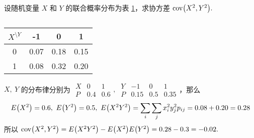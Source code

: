 \begin{example}[2002 数三]
    设随机变量 $X$ 和 $Y$ 的联合概率分布为表 \ref{-101007018015}，求协方差 $\mathrm{cov}\qty(X^2,Y^2).$
\end{example}
\begin{solution}
    \begin{minipage}{0.3\linewidth}
        \begin{table}[H]
            \centering
            \caption{}
            \label{-101007018015}
            \begin{tabular}{c | c c c}
                $X^{\displaystyle\setminus Y}$ & -1   & 0    & 1    \\
                \midrule
                0                              & 0.07 & 0.18 & 0.15 \\
                1                              & 0.08 & 0.32 & 0.20
            \end{tabular}
        \end{table}
    \end{minipage}\hfill
    \begin{minipage}{0.66\linewidth}
        $X,~Y$ 的分布律分别为 $\begin{array}{c|cc}
                X & 0   & 1   \\\hline
                P & 0.4 & 0.6
            \end{array},~\begin{array}{c|ccc}
                Y & -1   & 0   & 1    \\\hline
                P & 0.15 & 0.5 & 0.35
            \end{array}$，那么
        $$E\qty(X^2)=0.6,~E\qty(Y^2)=0.5,~E\qty(X^2Y^2)=\sum_i\sum_j x_i^2y_j^2 p_{ij}=0.08+0.20=0.28$$
        所以 $\mathrm{cov}\qty(X^2,Y^2)=E\qty(X^2Y^2)-E\qty(X^2)E\qty(Y^2)=0.28-0.3=-0.02.$
    \end{minipage}
\end{solution}

